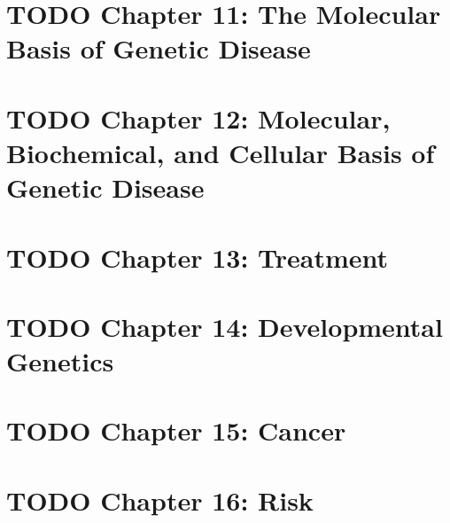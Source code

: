 \documentclass{scrartcl}
\begin{document}
\section{{\bfseries\sffamily TODO} Chapter 11: The Molecular Basis of Genetic Disease}
\label{sec:org7f9249c}
\section{{\bfseries\sffamily TODO} Chapter 12: Molecular, Biochemical, and Cellular Basis of Genetic Disease}
\label{sec:org3abe494}
\section{{\bfseries\sffamily TODO} Chapter 13: Treatment}
\label{sec:orgf1f477b}
\section{{\bfseries\sffamily TODO} Chapter 14: Developmental Genetics}
\label{sec:org0061d24}
\section{{\bfseries\sffamily TODO} Chapter 15: Cancer}
\label{sec:orgb28090e}
\section{{\bfseries\sffamily TODO} Chapter 16: Risk}
\label{sec:org313f35e}
\end{document}
